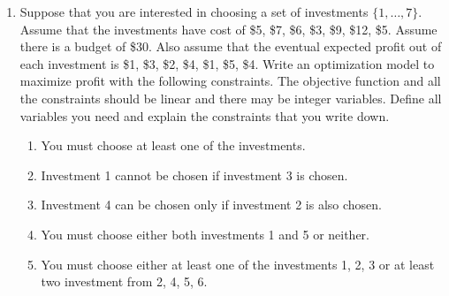 \documentclass{article}
\begin{document}
\begin{enumerate}
\begin{enumerate}
        \textbf{Explanation:}
        \begin{itemize}
            \item If $\delta = 0$, the first constraint gives $x_1 + x_2 \ge 1$, while the second becomes $x_1 - x_2 \ge 1 + m_2$. By the definition of $m_2$ this second inequality is automatically satisfied for all admissible $(x_1,x_2)$ and is thus nonbinding. This corresponds to the case where the “if” part is false, so we only need $x_1 + x_2 \ge 1$.
            \item If $\delta = 1$, the first constraint reduces to $x_1 + x_2 \ge 1 + m_1$, which is automatically satisfied by all admissible $(x_1,x_2)$, while the second constraint becomes $x_1 - x_2 \ge 1$, enforcing the “then” part when the “if” part holds.
        \end{itemize}
        The use of $\min$ in the definitions of $m_1$ and $m_2$ guarantees $m_1 \le 0$ and $m_2 \le 0$. Thus, when $\delta = 1$, the first constraint becomes $x_1 + x_2 \ge 1 + m_1 \le 1$, which is automatically satisfied by any point that already satisfies $x_1 + x_2 < 1$, and plays no restrictive role; only $x_1 - x_2 \ge 1$ remains active. When $\delta = 0$, the second constraint becomes $x_1 - x_2 \ge 1 + m_2 \le 1$, which is automatically satisfied, while $x_1 + x_2 \ge 1$ is enforced. In this way, $m_1$ and $m_2$ act as ``small-$m$'' parameters chosen from the domain of $(x_1,x_2)$ so that the constraints relax exactly in the branch where the implication is not binding.
        Therefore, the feasible $(x_1,x_2)$ for which there exists some $\delta \in \{0,1\}$ satisfying the above constraints are exactly those satisfying the original if-then statement.
        
    \end{enumerate}
    
    \item Suppose that you are interested in choosing a set of
investments $\{1, \dots, 7\}$. Assume that the investments have cost of
\$5, \$7, \$6, \$3, \$9, \$12, \$5. Assume there is a budget of \$30.
Also assume that the eventual expected profit out of each
investment is \$1, \$3, \$2, \$4, \$1, \$5, \$4. Write an optimization model to maximize profit with the following constraints. The objective function and all the constraints should be linear and there may be integer variables. Define all variables you need and explain the constraints that you write down.
\begin{enumerate}
\item You must choose at least one of the investments.
\item Investment 1 cannot be chosen if investment 3 is chosen.
\item Investment 4 can be chosen only if investment 2 is also
chosen.
\item You must choose either both investments 1 and 5 or
neither.
\item You must choose either at least one of the investments
1, 2, 3 or at least two investment from 2, 4, 5, 6.
\end{enumerate}


\end{enumerate}
\end{document}
